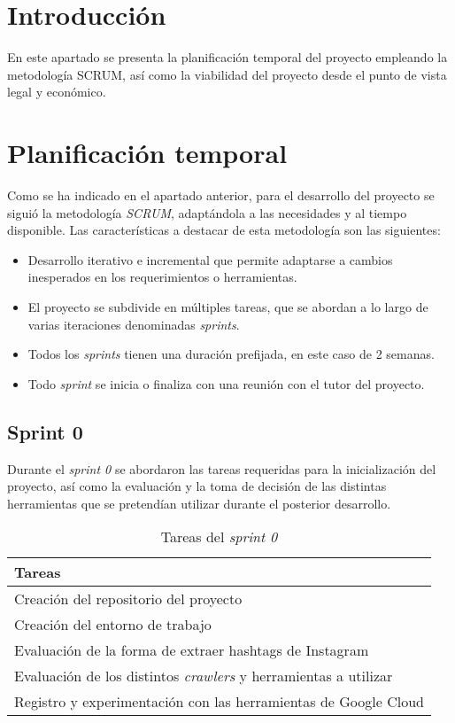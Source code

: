 
\section{Introducción}

En este apartado se presenta la planificación temporal del proyecto empleando la metodología SCRUM, así como la viabilidad del proyecto desde el punto de vista legal y económico.

\section{Planificación temporal}

Como se ha indicado en el apartado anterior, para el desarrollo del proyecto se siguió la metodología \textit{SCRUM}, adaptándola a las necesidades y al tiempo disponible. Las características a destacar de esta metodología son las siguientes:

\begin{itemize}
    \item Desarrollo iterativo e incremental que permite adaptarse a cambios inesperados en los requerimientos o herramientas.
    \item El proyecto se subdivide en múltiples tareas, que se abordan a lo largo de varias iteraciones denominadas \textit{sprints}.
    \item Todos los \textit{sprints} tienen una duración prefijada, en este caso de 2 semanas.
    \item Todo \textit{sprint} se inicia o finaliza con una reunión con el tutor del proyecto.
\end{itemize}

\subsection{Sprint 0}
Durante el \textit{sprint 0} se abordaron las tareas requeridas para la inicialización del proyecto, así como la evaluación y la toma de decisión de las distintas herramientas que se pretendían utilizar durante el posterior desarrollo.

\begin{table}[H]
    \centering
    \begin{tabular}{l}
    \hline
    \textbf{Tareas} \\ \hline
    Creación del repositorio del proyecto \\
    Creación del entorno de trabajo \\
    Evaluación de la forma de extraer hashtags de Instagram \\
    Evaluación de los distintos \textit{crawlers} y herramientas a utilizar \\
    Registro y experimentación con las herramientas de Google Cloud \\ \hline
    \end{tabular}
    \caption{Tareas del \textit{sprint 0}}
    \label{tab:tasks_sprint0}
\end{table}

